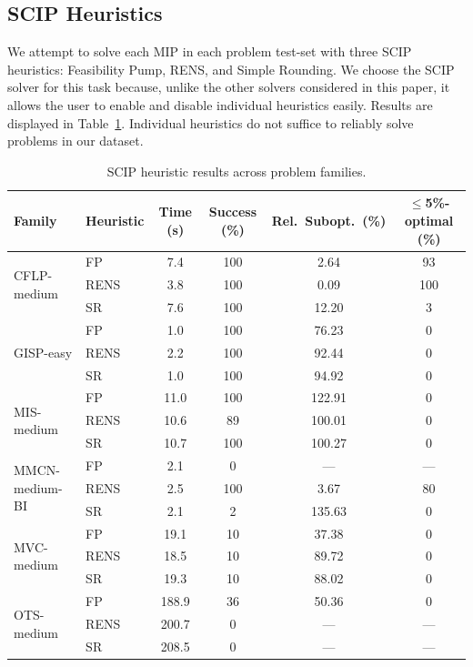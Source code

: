 \documentclass[12pt]{article}
\renewcommand{\cite}[1]{\citep{#1}}
\theoremstyle{definition}
\theoremstyle{remark}
\theoremstyle{plain}
\theoremstyle{definition}
\theoremstyle{remark}
\begin{document}
{\subsection{SCIP Heuristics}
We attempt to solve each MIP in each problem test-set with three SCIP~\cite{Hojny2025TheSO} heuristics: Feasibility Pump, RENS, and Simple Rounding.
We choose the SCIP solver for this task because, unlike the other solvers considered in this paper, it allows the user to enable and disable individual heuristics easily.
Results are displayed in Table~\ref{tab:scip_heuristics}.
Individual heuristics do not suffice to reliably solve problems in our dataset.
%
\begin{table}[h]
\small
\centering
\caption{SCIP heuristic results across problem families.}
\label{tab:scip_heuristics}
\begin{tabular}{llcccc}
\toprule
Family & Heuristic & Time (s) & Success (\%) & Rel.\ Subopt.\ (\%) & $\leq$5\%-optimal (\%) \\
\midrule
\multirow{3}{*}{CFLP-medium}    & FP & 7.4   & 100 & 2.64   & 93  \\
                                & RENS             & 3.8   & 100 & 0.09   & 100 \\
                                & SR  & 7.6   & 100 & 12.20  & 3   \\
\midrule
\multirow{3}{*}{GISP-easy}      & FP & 1.0   & 100 & 76.23  & 0   \\
                                & RENS             & 2.2   & 100 & 92.44  & 0   \\
                                & SR  & 1.0   & 100 & 94.92  & 0   \\
\midrule
\multirow{3}{*}{MIS-medium}     & FP & 11.0  & 100 & 122.91 & 0   \\
                                & RENS             & 10.6  & 89  & 100.01 & 0   \\
                                & SR  & 10.7  & 100 & 100.27 & 0   \\
\midrule
\multirow{3}{*}{MMCN-medium-BI} & FP & 2.1   & 0   & ---    & --- \\
                                & RENS             & 2.5   & 100 & 3.67   & 80  \\
                                & SR  & 2.1   & 2   & 135.63 & 0   \\
\midrule
\multirow{3}{*}{MVC-medium}     & FP & 19.1  & 10  & 37.38  & 0   \\
                                & RENS             & 18.5  & 10  & 89.72  & 0   \\
                                & SR  & 19.3  & 10  & 88.02  & 0   \\
\midrule
\multirow{3}{*}{OTS-medium}     & FP & 188.9 & 36  & 50.36  & 0   \\
                                & RENS             & 200.7 & 0   & ---    & --- \\
                                & SR  & 208.5 & 0   & ---    & --- \\
\bottomrule
\end{tabular}
\end{table}
}
\end{document}
